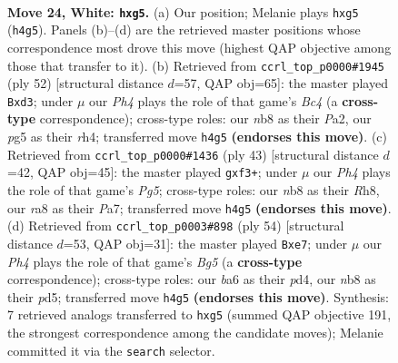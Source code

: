 \documentclass[11pt]{article}
\begin{document}
\clearpage

\begin{figure}[p]\centering
\begin{subfigure}{0.46\textwidth}\centering
\resizebox{\linewidth}{!}{%
\newchessgame
\chessboard[
  setfen={rn2k1r1/p7/b7/5pp1/1P5P/2B5/P3PP2/R2R2K1 w q - 0 24},
  showmover=false,
  pgfstyle=straightmove, color=movearrow, markmove={h4-g5}
]}
\caption{}
\end{subfigure}\hfill
\begin{subfigure}{0.46\textwidth}\centering
\resizebox{\linewidth}{!}{%
\newchessgame
\chessboard[
  setfen={5k1r/p5p1/8/5b2/2B4r/3p4/PP2PP1P/R4RK1 w - - 0 27},
  showmover=false,
  pgfstyle=straightmove, color=movearrow, markmove={c4-d3}
]}
\caption{}
\end{subfigure}
\\[4pt]
\begin{subfigure}{0.46\textwidth}\centering
\resizebox{\linewidth}{!}{%
\newchessgame
\chessboard[
  setfen={6rr/ppB1k3/2p5/8/3N2pb/5P2/PPP5/R2R2K1 b - - 1 22},
  showmover=false,
  pgfstyle=straightmove, color=movearrow, markmove={g4-f3}
]}
\caption{}
\end{subfigure}\hfill
\begin{subfigure}{0.46\textwidth}\centering
\resizebox{\linewidth}{!}{%
\newchessgame
\chessboard[
  setfen={2r1r1k1/4b1p1/8/1p1pP1B1/1P1p4/8/5PP1/R3R1K1 w - - 0 28},
  showmover=false,
  pgfstyle=straightmove, color=movearrow, markmove={g5-e7}
]}
\caption{}
\end{subfigure}
\caption{\textbf{Move 24, White: \texttt{hxg5}.} (a) Our position; Melanie plays \texttt{hxg5} (\texttt{h4g5}). Panels (b)--(d) are the retrieved master positions whose correspondence most drove this move (highest QAP objective among those that transfer to it). (b) Retrieved from \texttt{ccrl\_top\_p0000\#1945} (ply 52) [structural distance $d$=57, QAP obj=65]: the master played \texttt{Bxd3}; under $\mu$ our \emph{Ph4} plays the role of that game's \emph{Bc4} (a \textbf{cross-type} correspondence); cross-type roles: our \emph{n}b8 as their \emph{P}a2, our \emph{p}g5 as their \emph{r}h4; transferred move \texttt{h4g5} \textbf{(endorses this move)}. (c) Retrieved from \texttt{ccrl\_top\_p0000\#1436} (ply 43) [structural distance $d$=42, QAP obj=45]: the master played \texttt{gxf3+}; under $\mu$ our \emph{Ph4} plays the role of that game's \emph{Pg5}; cross-type roles: our \emph{n}b8 as their \emph{R}h8, our \emph{r}a8 as their \emph{P}a7; transferred move \texttt{h4g5} \textbf{(endorses this move)}. (d) Retrieved from \texttt{ccrl\_top\_p0003\#898} (ply 54) [structural distance $d$=53, QAP obj=31]: the master played \texttt{Bxe7}; under $\mu$ our \emph{Ph4} plays the role of that game's \emph{Bg5} (a \textbf{cross-type} correspondence); cross-type roles: our \emph{b}a6 as their \emph{p}d4, our \emph{n}b8 as their \emph{p}d5; transferred move \texttt{h4g5} \textbf{(endorses this move)}. Synthesis: 7 retrieved analogs transferred to \texttt{hxg5} (summed QAP objective 191, the strongest correspondence among the candidate moves); Melanie committed it via the \texttt{search} selector.}
\label{fig:thought-m46}
\end{figure}
\end{document}
